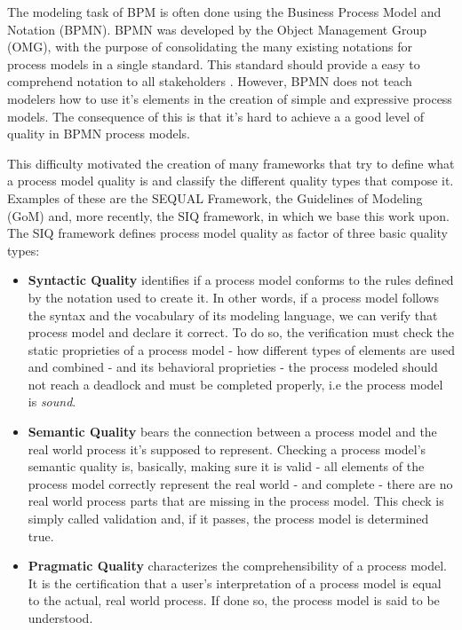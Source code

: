 \documentclass[a4paper,twoside]{article}
\begin{document}
The modeling task of BPM is often done using the Business Process Model and Notation (BPMN). BPMN was developed by the Object Management Group (OMG), with the purpose of consolidating the many existing notations for process models in a single standard. This standard should provide a easy to comprehend notation to all stakeholders \cite{OMGObjectManagementGroup2015}. However, BPMN does not teach modelers how to use it's elements in the creation of simple and expressive process models. The consequence of this is that it's hard to achieve a a good level of quality in BPMN process models.


This difficulty motivated the creation of many frameworks that try to define what a process model quality is and classify the different quality types that compose it. Examples of these are the SEQUAL Framework, the Guidelines of Modeling (GoM) and, more recently, the SIQ framework, in which we base this work upon. The SIQ framework defines process model quality as factor of three basic quality types:

\begin{itemize}
	\item \textbf{Syntactic Quality} identifies if a process model conforms to the rules defined by the notation used to create it. In other words, if a process model follows the syntax and the vocabulary of its modeling language, we can verify that process model and declare it correct. To do so, the verification must check the static proprieties of a process model - how different types of elements are used and combined - and its behavioral proprieties - the process modeled should not reach a deadlock and must be completed properly, i.e the process model is \textit{sound}.
	\item \textbf{Semantic Quality} bears the connection between a process model and the real world process it's supposed to represent. Checking a process model's semantic quality is, basically, making sure it is valid - all elements of the process model correctly represent the real world - and complete - there are no real world process parts that are missing in the process model. This check is simply called validation and, if it passes, the process model is determined true.
	\item \textbf{Pragmatic Quality} characterizes the comprehensibility of a process model. It is the certification that a user's interpretation of a process model is equal to the actual, real world process. If done so, the process model is said to be understood.
\end{itemize}
\end{document}
